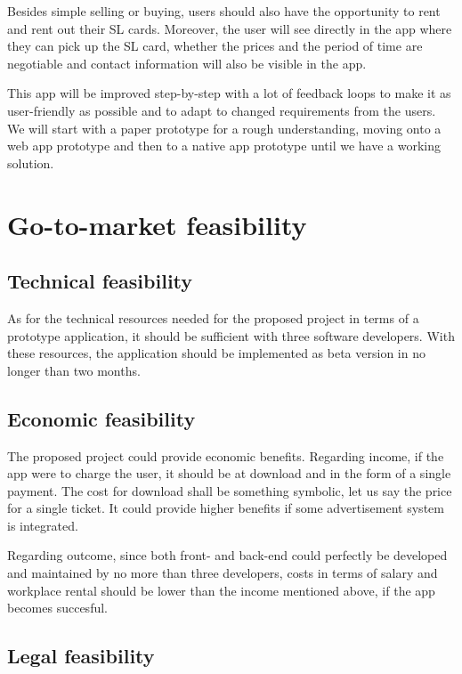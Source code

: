 \documentclass[11pt,twoside,a4paper]{report}
\begin{document}
Besides simple selling or buying, users should also have the opportunity to rent and rent out their SL cards. Moreover, the user will see directly in the app where they can pick up the SL card, whether the prices and the period of time are negotiable and contact information will also be visible in the app.

This app will be improved step-by-step with a lot of feedback loops to make it as user-friendly as possible and to adapt to changed requirements from the users. We will start with a paper prototype for a rough understanding, moving onto a web app prototype and then to a native app prototype until we have a working solution.

\chapter{Go-to-market feasibility}

\section{Technical feasibility}

As for the technical resources needed for the proposed project in terms of a prototype application, it should be sufficient with three software developers. With these resources, the application should be implemented as beta version in no longer than two months.

\section{Economic feasibility}

The proposed project could provide economic benefits. Regarding income, if the app were to charge the user, it should be at download and in the form of a single payment. The cost for download shall be something symbolic, let us say the price for a single ticket. It could provide higher benefits if some advertisement system is integrated.

Regarding outcome, since both front- and back-end could perfectly be developed and maintained by no more than three developers, costs in terms of salary and workplace rental should be lower than the income mentioned above, if the app becomes succesful.

\section{Legal feasibility}
\end{document}
